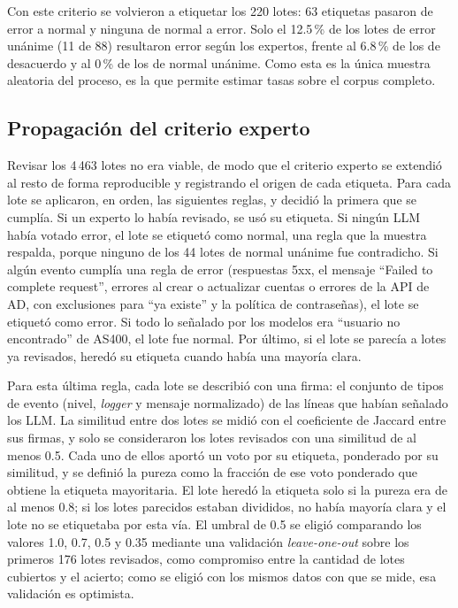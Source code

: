 Con este criterio se volvieron a etiquetar los 220 lotes: 63 etiquetas pasaron de error a normal y ninguna de normal a error. Solo el 12.5\,\% de los lotes de error unánime (11 de 88) resultaron error según los expertos, frente al 6.8\,\% de los de desacuerdo y al 0\,\% de los de normal unánime. Como esta es la única muestra aleatoria del proceso, es la que permite estimar tasas sobre el corpus completo.

\subsection{Propagación del criterio experto}\label{subsec:met_propagacion}

Revisar los 4\,463 lotes no era viable, de modo que el criterio experto se extendió al resto de forma reproducible y registrando el origen de cada etiqueta. Para cada lote se aplicaron, en orden, las siguientes reglas, y decidió la primera que se cumplía. Si un experto lo había revisado, se usó su etiqueta. Si ningún LLM había votado error, el lote se etiquetó como normal, una regla que la muestra respalda, porque ninguno de los 44 lotes de normal unánime fue contradicho. Si algún evento cumplía una regla de error (respuestas 5xx, el mensaje ``Failed to complete request'', errores al crear o actualizar cuentas o errores de la API de AD, con exclusiones para ``ya existe'' y la política de contraseñas), el lote se etiquetó como error. Si todo lo señalado por los modelos era ``usuario no encontrado'' de AS400, el lote fue normal. Por último, si el lote se parecía a lotes ya revisados, heredó su etiqueta cuando había una mayoría clara.

Para esta última regla, cada lote se describió con una firma: el conjunto de tipos de evento (nivel, \textit{logger} y mensaje normalizado) de las líneas que habían señalado los LLM. La similitud entre dos lotes se midió con el coeficiente de Jaccard entre sus firmas, y solo se consideraron los lotes revisados con una similitud de al menos 0.5. Cada uno de ellos aportó un voto por su etiqueta, ponderado por su similitud, y se definió la pureza como la fracción de ese voto ponderado que obtiene la etiqueta mayoritaria. El lote heredó la etiqueta solo si la pureza era de al menos 0.8; si los lotes parecidos estaban divididos, no había mayoría clara y el lote no se etiquetaba por esta vía. El umbral de 0.5 se eligió comparando los valores 1.0, 0.7, 0.5 y 0.35 mediante una validación \textit{leave-one-out} sobre los primeros 176 lotes revisados, como compromiso entre la cantidad de lotes cubiertos y el acierto; como se eligió con los mismos datos con que se mide, esa validación es optimista.

